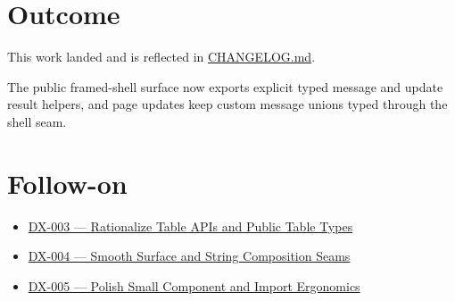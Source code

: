 \section{Outcome}\label{record-120-outcome}

This work landed and is reflected in \href{https://github.com/flyingrobots/bijou/blob/cbd70612140e7a450d764b3c7be1c6af878b99bc/docs/CHANGELOG.md}{CHANGELOG.md}.

The public framed-shell surface now exports explicit typed message and update result helpers, and page updates keep custom message unions typed through the shell seam.

\section{Follow-on}\label{record-120-follow-on}

\begin{itemize}
\tightlist
\item
  \href{https://github.com/flyingrobots/bijou/blob/cbd70612140e7a450d764b3c7be1c6af878b99bc/docs/method/graveyard/legacy-backlog/DX-003-rationalize-table-apis-and-public-table-types.md}{DX-003 --- Rationalize Table APIs and Public Table Types}
\item
  \href{https://github.com/flyingrobots/bijou/blob/cbd70612140e7a450d764b3c7be1c6af878b99bc/docs/method/graveyard/legacy-backlog/DX-004-smooth-surface-and-string-composition-seams.md}{DX-004 --- Smooth Surface and String Composition Seams}
\item
  \href{https://github.com/flyingrobots/bijou/blob/cbd70612140e7a450d764b3c7be1c6af878b99bc/docs/method/graveyard/legacy-backlog/DX-005-polish-small-component-and-import-ergonomics.md}{DX-005 --- Polish Small Component and Import Ergonomics}
\end{itemize}

